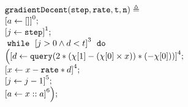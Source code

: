            
                  
                  
                                  \begin{example}
                  \[
                  \begin{array}{l}
                  \kw{gradientDecent(step, rate, t, n)} \triangleq \\
                         \clabel{ a \leftarrow []}^{0} ; \\
                          \clabel{\assign{j}{\kw{step}} }^{1} ; \\
                          \ewhile ~ \clabel{j > 0 \land d < t}^{3} ~ \edo ~ \\
                          \Big(
                              \clabel{\assign{d}{\query(2 * (\chi[1] - (\chi[0]\times x )) * (-\chi[0]))} }^{4}  ; \\
                              \clabel{\assign{x}{x - \kw{rate} * d} }^{4}  ; \\
                           \clabel{\assign{j}{j-1}}^{5} ;\\
                          \clabel{a \leftarrow x :: a}^{6} 
                          \Big);
                      \end{array}
                  \]
                  \end{example}    
    
